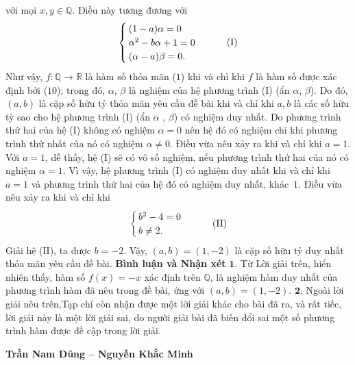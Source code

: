 \begin{multicols}{2}
\begin{align*}
	\end{align*}
	với mọi $x,y \in \mathbb{Q}$.
	\vskip 0.05cm
	Điều này tương đương với
	\begin{align*}
		\begin{cases}
			(1-a)\alpha = 0\\
			\alpha^2 - b\alpha + 1 = 0\\
			(\alpha - a)\beta = 0.
		\end{cases} \tag{$\text{I}$}
	\end{align*}
	Như vậy, $f: \mathbb{Q} \to \mathbb{R}$  là hàm số thỏa mãn ($1$) khi và chỉ khi $f$  là hàm số được xác định bởi ($10$); trong đó, $\alpha$, $\beta$  là nghiệm của hệ phương trình ($\text{I}$) (ẩn  $\alpha$, $\beta$).
	\vskip 0.05cm
	Do đó, $(a, b)$ là cặp số hữu tỷ thỏa mãn yêu cầu đề bài khi và chỉ khi $a, b$ là các số hữu tỷ sao cho hệ phương trình ($\text{I}$) (ẩn  $\alpha$ , $\beta$) có nghiệm duy nhất.
	\vskip 0.05cm
	Do phương trình thứ hai của hệ ($\text{I}$) không có nghiệm $\alpha = 0$  nên hệ đó có nghiệm chỉ khi phương trình thứ nhất của nó có nghiệm  $\alpha \ne 0$. Điều vừa nêu xảy ra khi và chỉ khi $a = 1$.
	\vskip 0.05cm
	Với $a = 1$, dễ thấy, hệ ($\text{I}$) sẽ có vô số nghiệm, nếu phương trình thứ hai của nó có nghiệm $\alpha = 1$.
	\vskip 0.05cm 
	Vì vậy, hệ phương trình ($\text{I}$) có nghiệm duy nhất khi và chỉ khi $a = 1$ và phương trình thứ hai của hệ đó có nghiệm duy nhất, khác~$1$. Điều vừa nêu xảy ra khi và chỉ khi
	\begin{align*}
		\begin{cases}
			b^2 - 4 = 0\\
			b \ne 2.
		\end{cases}\tag{$\text{II}$}
	\end{align*}
	Giải hệ ($\text{II}$), ta được $b = -2$.
	\vskip 0.05cm
	Vậy, $(a,b) = (1, -2)$  là cặp số hữu tỷ duy nhất thỏa mãn yêu cầu đề bài.
	\vskip 0.05cm
	\textbf{\color{thachthuctoanhoc}Bình luận và Nhận xét}
	\vskip 0.05cm
	$\pmb{1.}$ Từ Lời giải trên, hiển nhiên thấy, hàm số $f(x) = -x$  xác định trên  $\mathbb{Q}$, là nghiệm hàm duy nhất của phương trình hàm đã nêu trong đề bài, ứng với  $(a,b) = (1,-2)$.
	\vskip 0.05cm
	$\pmb{2.}$ Ngoài lời giải nêu trên,Tạp chí còn nhận được một lời giải khác cho bài đã ra, và rất tiếc, lời giải này là một lời giải sai, do người giải bài đã biến đổi sai một số phương trình hàm được đề cập trong lời giải.
	\begin{flushright}
		\textbf{\color{thachthuctoanhoc}Trần Nam Dũng -- Nguyễn Khắc Minh}
	\end{flushright}

\end{multicols}
